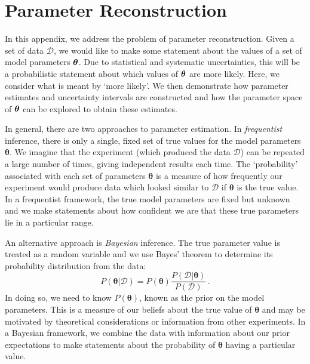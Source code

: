 \chapter{Parameter Reconstruction}
\label{ch:ParamRecon}



In this appendix, we address the problem of parameter reconstruction. Given a set of data $\mathcal{D}$, we would like to make some statement about the values of a set of model parameters $\boldsymbol\theta$. Due to statistical and systematic uncertainties, this will be a probabilistic statement about which values of $\boldsymbol\theta$ are more likely. Here, we consider what is meant by `more likely'. We then demonstrate how parameter estimates and uncertainty intervals are constructed and how the parameter space of $\boldsymbol\theta$ can be explored to obtain these estimates.

In general, there are two approaches to parameter estimation. In \textit{frequentist} inference, there is only a single, fixed set of true values for the model parameters $\boldsymbol\theta$. We imagine that the experiment (which produced the data $\mathcal{D}$) can be repeated a large number of times, giving independent results each time. The `probability' associated with each set of parameters $\boldsymbol\theta$ is a measure of how frequently our experiment would produce data which looked similar to $\mathcal{D}$ if $\boldsymbol\theta$ is the true value. In a frequentist framework, the true model parameters are fixed but unknown and we make statements about how confident we are that these true parameters lie in a particular range.

An alternative approach is \textit{Bayesian} inference. The true parameter value is treated as a random variable and we use Bayes' theorem to determine its probability distribution from the data:
\begin{equation}
P(\boldsymbol\theta|\mathcal{D}) = P(\boldsymbol\theta) \frac{P(\mathcal{D}|\boldsymbol\theta)}{P(\mathcal{D})}\,.
\end{equation}
In doing so, we need to know $P(\boldsymbol\theta)$, known as the prior on the model parameters. This is a measure of our beliefs about the true value of $\boldsymbol\theta$ and may be motivated by theoretical considerations or information from other experiments. In a Bayesian framework, we combine the data with information about our prior expectations to make statements about the probability of $\boldsymbol\theta$ having a particular value.

